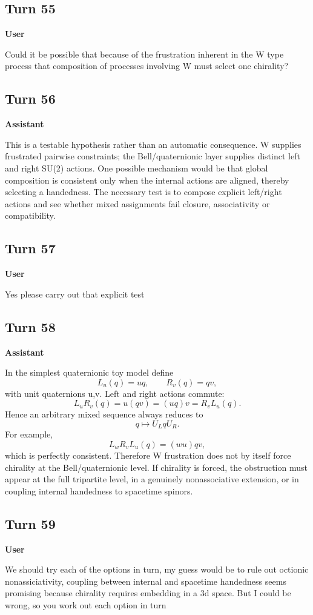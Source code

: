 \documentclass[11pt,a4paper]{article}
\newcommand{\speaker}[1]{\par\medskip\noindent\textbf{\large #1}\par\smallskip}
\begin{document}
\subsection*{Turn 55}
\speaker{User}
Could it be possible that because of the frustration inherent in the W type process that composition of processes involving W must select one chirality?
\subsection*{Turn 56}
\speaker{Assistant}
This is a testable hypothesis rather than an automatic consequence. W supplies frustrated pairwise constraints; the Bell/quaternionic layer supplies distinct left and right SU(2) actions. One possible mechanism would be that global composition is consistent only when the internal actions are aligned, thereby selecting a handedness. The necessary test is to compose explicit left/right actions and see whether mixed assignments fail closure, associativity or compatibility.
\subsection*{Turn 57}
\speaker{User}
Yes please carry out that explicit test
\subsection*{Turn 58}
\speaker{Assistant}
In the simplest quaternionic toy model define
\[
L_u(q)=uq,\qquad R_v(q)=qv,
\]
with unit quaternions u,v. Left and right actions commute:
\[
L_uR_v(q)=u(qv)=(uq)v=R_vL_u(q).
\]
Hence an arbitrary mixed sequence always reduces to
\[
q\mapsto U_L q U_R.
\]
For example,
\[
L_wR_vL_u(q)=(wu)qv,
\]
which is perfectly consistent. Therefore W frustration does not by itself force chirality at the Bell/quaternionic level. If chirality is forced, the obstruction must appear at the full tripartite level, in a genuinely nonassociative extension, or in coupling internal handedness to spacetime spinors.
\subsection*{Turn 59}
\speaker{User}
We should try each of the options in turn, my guess would be to rule out octionic nonassiciativity, coupling between internal and spacetime handedness seems promising because chirality requires embedding in a 3d space. But I could be wrong, so you work out each option in turn
\end{document}

